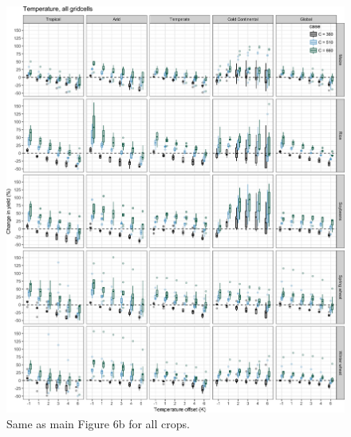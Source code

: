 \documentclass[10pt]{article}
\begin{document}
\begin{figure}[h!]
\centering
\includegraphics[width=\textwidth]{s_sim_CG_TC.png}
\caption{Same as main Figure 6b for all crops.}
\label{fig:carbontemp}
\end{figure}
\end{document}
